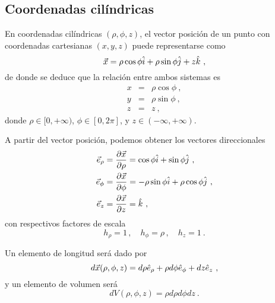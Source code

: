 \subsection{Coordenadas cilíndricas}

En coordenadas cilíndricas $(\rho, \phi, z)$, el vector posición de un punto con coordenadas cartesianas $(x,y,z)$ puede representarse como 
\begin{equation}
    \vec{x} = \rho \cos \phi \hat{i} + \rho \sin \phi \hat{j} + z \hat{k} \ ,
\end{equation}
de donde se deduce que la relación entre ambos sistemas es 
\begin{equation}
    \begin{array}{rcl}
        x & = & \rho \cos \phi \ , \\
        y & = & \rho \sin \phi \ , \\
        z & = & z \ ,
    \end{array}
\end{equation} 
donde $\rho \in [0, +\infty)$, $\phi \in [0, 2\pi]$, y $z \in (-\infty, +\infty)$.

A partir del vector posición, podemos obtener los vectores direccionales 
\begin{align}
    \vec{e}_\rho & = \frac{\partial \vec{x}}{\partial \rho} = \cos \phi \hat{i} + \sin \phi \hat{j} \ , \\
    \vec{e}_\phi & = \frac{\partial \vec{x}}{\partial \phi} = -\rho \sin \phi  \hat{i} + \rho \cos \phi \hat{j} \ , \\
    \vec{e}_z & = \frac{\partial \vec{x}}{\partial z} = \hat{k} \ ,
\end{align}
con respectivos factores de escala 
\begin{equation}
    h_\rho = 1 \, , \quad h_\phi = \rho \, , \quad h_z = 1 \ .
\end{equation}

Un elemento de longitud será dado por 
\begin{equation}
    d\vec{x}(\rho, \phi, z) = d\rho \hat{e}_\rho + \rho d\phi \hat{e}_\phi + dz \hat{e}_z \ ,
\end{equation}
y un elemento de volumen será
\begin{equation}
    dV(\rho, \phi, z) = \rho d\rho d\phi dz \ .
\end{equation}


